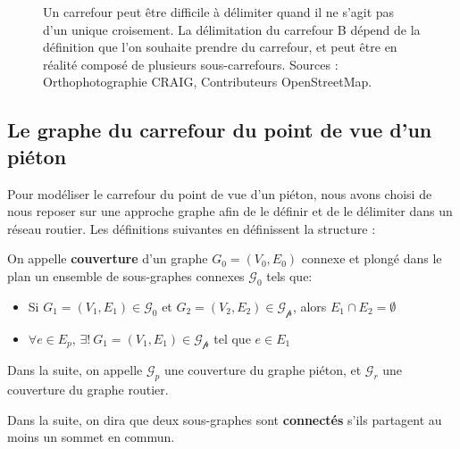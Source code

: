 \begin{figure}
    \centering
    \caption[La délimitation du carrefour]{Un carrefour peut être difficile à délimiter quand il ne s'agit pas d'un unique croisement. La délimitation du carrefour B dépend de la définition que l'on souhaite prendre du carrefour, et peut être en réalité composé de plusieurs sous-carrefours. Sources : Orthophotographie CRAIG, Contributeurs OpenStreetMap.}
    \label{fig:modelisation_simplecomplexe}
\end{figure}


\subsection{Le graphe du carrefour du point de vue d'un piéton}

Pour modéliser le carrefour du point de vue d'un piéton, nous avons choisi de nous reposer sur une approche graphe afin de le définir et de le délimiter dans un réseau routier. Les définitions suivantes en définissent la structure :

\begin{definition}
    On appelle \textbf{couverture} d'un graphe $G_0 = (V_0,E_0)$ connexe et plongé dans le plan un ensemble de sous-graphes connexes $\mathcal{G_0}$ tels que:
    \begin{itemize}
        \item Si $G_1=(V_1, E_1) \in \mathcal{G_0}$ et $G_2=(V_2, E_2) \in \mathcal{G_p}$, alors $E_1 \cap E_2 = \emptyset$
        \item $\forall e \in E_p$, $\exists!~G_1=(V_1, E_1) \in \mathcal{G_p}$ tel que $e \in E_1$
    \end{itemize}
    
    Dans la suite, on appelle $\mathcal{G}_p$ une couverture du graphe piéton, et $\mathcal{G}_r$ une couverture du graphe routier.
    
    Dans la suite, on dira que deux sous-graphes sont \textbf{connectés} s'ils partagent au moins un sommet en commun.
\end{definition}

